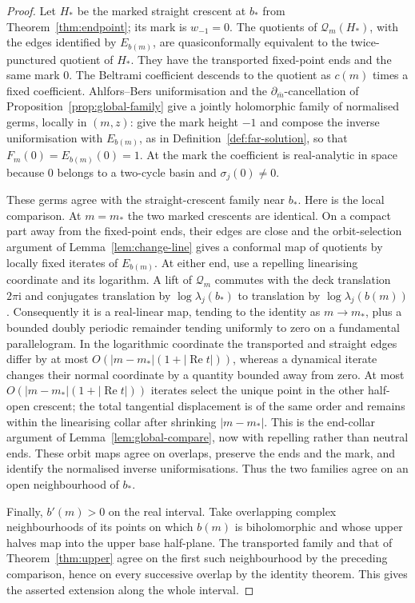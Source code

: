 \documentclass[11pt]{amsart}
\theoremstyle{definition}
\newcommand{\ii}{\mathrm{i}}
\begin{document}
\begin{proof}
Let $H_*$ be the marked straight crescent at $b_*$ from
Theorem~\ref{thm:endpoint}; its mark is $w_{-1}=0$.
The quotients of $\mathcal Q_m(H_*)$, with the edges identified by $E_{b(m)}$,
are quasiconformally equivalent to the twice-punctured quotient of $H_*$.
They have the transported fixed-point ends and the same mark $0$.
The Beltrami coefficient descends to the quotient as $c(m)$ times a
fixed coefficient.  Ahlfors--Bers uniformisation and the
$\partial_{\bar m}$-cancellation of
Proposition~\ref{prop:global-family} give a jointly holomorphic family
of normalised germs, locally in $(m,z)$: give the mark height $-1$ and
compose the inverse uniformisation with $E_{b(m)}$, as in
Definition~\ref{def:far-solution}, so that $F_m(0)=E_{b(m)}(0)=1$.
At the mark the coefficient is
real-analytic in space because $0$ belongs to a two-cycle basin and
$\sigma_j(0)\ne0$.

These germs agree with the straight-crescent family near $b_*$.
Here is the local comparison.  At $m=m_*$ the two marked crescents are
identical.  On a compact part away from the fixed-point ends, their
edges are close and the orbit-selection argument of
Lemma~\ref{lem:change-line} gives a conformal map of quotients by
locally fixed iterates of $E_{b(m)}$.  At either end, use a repelling
linearising coordinate and its logarithm.  A lift of $\mathcal Q_m$ commutes
with the deck translation $2\pi\ii$ and conjugates translation by
$\log\lambda_j(b_*)$ to translation by $\log\lambda_j(b(m))$.
Consequently it is a real-linear map, tending to the identity as
$m\to m_*$, plus a bounded doubly periodic remainder tending uniformly
to zero on a fundamental parallelogram.  In the logarithmic coordinate
the transported and straight edges differ by at most
$O(|m-m_*|(1+|\operatorname{Re}t|))$, whereas a dynamical iterate changes their
normal coordinate by a quantity bounded away from zero.  At most
$O(|m-m_*|(1+|\operatorname{Re}t|))$ iterates select the unique point in the
other half-open crescent; the total tangential displacement is of the
same order and remains within the linearising collar after shrinking
$|m-m_*|$.  This is the end-collar argument of
Lemma~\ref{lem:global-compare}, now with repelling rather than neutral
ends.  These orbit maps agree on overlaps, preserve the ends
and the mark, and identify the normalised inverse uniformisations.
Thus the two families agree on an open neighbourhood of $b_*$.

Finally, $b'(m)>0$ on the real interval.  Take overlapping complex
neighbourhoods of its points on which $b(m)$ is biholomorphic and whose
upper halves map into the upper base half-plane.  The transported
family and that of Theorem~\ref{thm:upper} agree on the first such
neighbourhood by the preceding comparison, hence on every successive
overlap by the identity theorem.  This gives the asserted extension
along the whole interval.
\end{proof}
\end{document}
